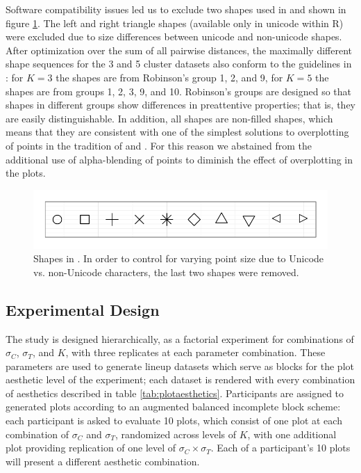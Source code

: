\documentclass[11pt]{isuthesis}\usepackage[]{graphicx}\usepackage[]{color}
\newenvironment{knitrout}{}{} %
\begin{document}
Software compatibility issues led us to exclude two shapes used in \citet{heer:2014} and shown in figure \ref{fig:shapes}. The left and right triangle shapes (available only in unicode within R) were excluded due to size differences between unicode and non-unicode shapes. After optimization over the sum of all pairwise distances, the maximally different shape sequences for the 3 and 5 cluster datasets also conform to the guidelines in \citet{robinson:03}: for $K=3$ the shapes are from Robinson's group 1, 2, and 9, for $K=5$ the shapes are from groups 1, 2, 3, 9, and 10. Robinson's groups are designed so that shapes in different groups show differences in preattentive properties; that is, they are easily distinguishable. In addition, all shapes are non-filled shapes, which means that they are consistent with one of the simplest solutions to overplotting of points in the tradition of \citet{eda, cleveland:85} and \citet{few}. For this reason we abstained from the additional use of alpha-blending of points to diminish the effect of overplotting in the plots.

\begin{figure}[ht]\centering
\begin{knitrout}
\color{fgcolor}

{\centering \includegraphics[width=.5\linewidth]{Figure/FeatureHierarchy/fig-shape-palette-1} 

}



\end{knitrout}
\caption[Shape palette used to maximize preattentive perception]{Shapes in \citet{heer:2014}. In order to control for varying point size due to Unicode vs. non-Unicode characters, the last two shapes were removed.\label{fig:shapes}}
\end{figure}

\subsection{Experimental Design}
The study is designed hierarchically, as a factorial experiment for combinations of $\sigma_C$, $\sigma_T$, and $K$, with three replicates at each parameter combination. These parameters are used to generate lineup datasets which serve as blocks for the plot aesthetic level of the experiment; each dataset is rendered with every combination of aesthetics described in table \ref{tab:plotaesthetics}. Participants are assigned to generated plots according to an augmented balanced incomplete block scheme: each participant is asked to evaluate 10 plots, which consist of one plot at each combination of $\sigma_C$ and $\sigma_T$, randomized across levels of $K$, with one additional plot providing replication of one level of $\sigma_C\times\sigma_T$. Each of a participant's 10 plots will present a different aesthetic combination.
\end{document}
